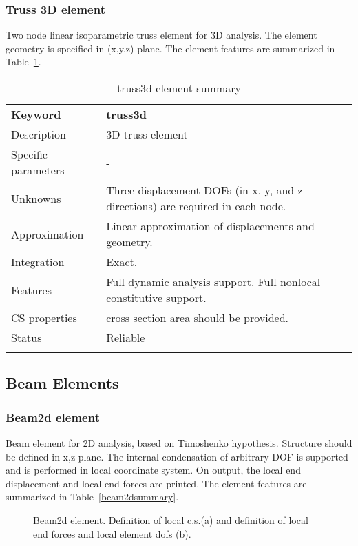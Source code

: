 \documentclass[a4paper]{article}
\newcommand{\templabel}{}%
\newcommand{\tempcaption}{}%
\newcounter{nelpar}
\newenvironment{elementsummary}[5]{%
  \gdef\tempcaption{#4}%
  \gdef\templabel{#5}%
  \setcounter{nelpar}{0}%
  \begin{center} %
    \begin{table}[!htb] %
      \begin{tabular}{|l|p{9cm}|}\hline %
        {\bf Keyword} & \bf{#1}\\ %
        {Description} & {#2}\\ %
        {Specific parameters} & {#3}\\ \hline %
}{
  \\ \hline %
      \end{tabular}%
      \caption{\tempcaption}%
      \label{\templabel}%
    \end{table}%
  \end{center}%
}
\newcommand{\elementDescription}[2]{{#1} & {#2}\\ }
\begin{document}
\subsubsection{Truss 3D element}
\label{Truss3d}

Two node linear isoparametric truss element for 3D analysis. The
element geometry is specified in (x,y,z) plane.  The element features are summarized in Table~\ref{truss3dsummary}.


\begin{elementsummary}{truss3d}{3D truss element}{-}{truss3d element summary}{truss3dsummary}
\elementDescription{Unknowns}{Three displacement DOFs (in x, y, and z directions) are required
in each node.}
\elementDescription{Approximation}{Linear approximation of displacements and geometry.}
\elementDescription{Integration}{Exact.}
\elementDescription{Features}{Full dynamic analysis support. Full nonlocal
constitutive support.}
\elementDescription{CS properties}{cross section area should be
provided.}
\elementDescription{Status}{Reliable}
\end{elementsummary}



\clearpage
\subsection{Beam Elements}
\subsubsection{Beam2d element}
Beam element for 2D analysis, based on Timoshenko hypothesis. Structure should be defined in x,z
plane. The internal condensation
of arbitrary DOF is supported and is performed in local coordinate
system. On output, the local end displacement and local end forces are
printed. The element features are summarized in Table~\ref{beam2dsummary}.

\begin{figure}[htb]
 \centering
 \begin{makeimage}
   
 \end{makeimage}
 \caption{Beam2d element. Definition of local c.s.(a)  and definition of
 local end forces and local element dofs (b).}
 \label{beam2dfig}
\end{figure}
\end{document}
